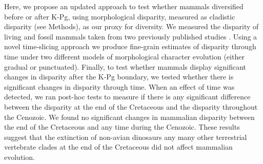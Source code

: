 \documentclass[12pt,letterpaper]{article}
\begin{document}

Here, we propose an updated approach to test whether mammals diversified before or after K-Pg, using morphological disparity, measured as cladistic disparity (see Methods), as our proxy for diversity.
We measured the disparity of living and fossil mammals taken from two previously published studies \citep{Slater2012MEE,beckancient2014}. %
Using a novel time-slicing approach we produce fine-grain estimates of disparity through time under two different models of morphological character evolution (either gradual or punctuated). 
Finally, to test whether mammals display significant changes in disparity after the K-Pg boundary, we tested whether there is significant changes in disparity through time.
When an effect of time was detected, we ran post-hoc tests to measure if there is any significant difference between the disparity at the end of the Cretaceous and the disparity throughout the Cenozoic.
We found no significant changes in mammalian disparity between the end of the Cretaceous and any time during the Cenozoic.
These results suggest that the extinction of non-avian dinosaurs any many other terrestrial vertebrate clades at the end of the Cretaceous did not affect mammalian evolution.
\end{document}
